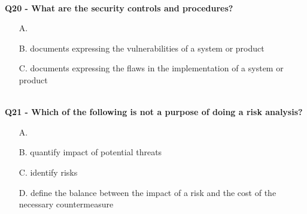 \textbf{\\Q20 - What are the security controls and procedures?}
\begin{enumerate}
    \item[A.] 
    \item[B.] documents expressing the vulnerabilities of a system or product
    \item[C.] documents expressing the flaws in the implementation of a system or product
\end{enumerate}

\textbf{\\Q21 - Which of the following is not a purpose of doing a risk analysis?}
\begin{enumerate}
    \item[A.] 
    \item[B.] quantify impact of potential threats
    \item[C.] identify risks
    \item[D.] define the balance between the impact of a risk and the cost of the necessary countermeasure
\end{enumerate}

